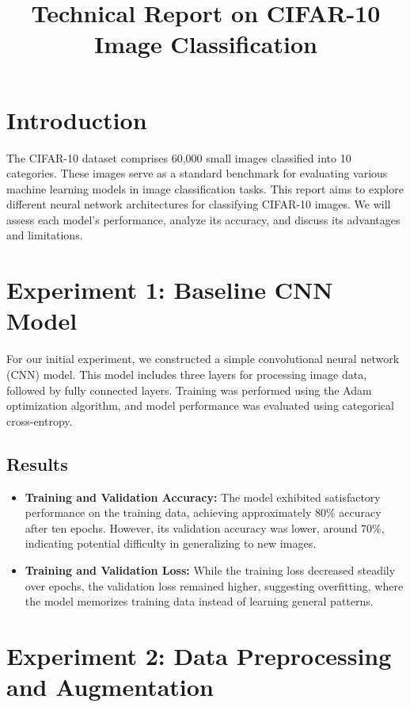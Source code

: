 \documentclass{article}
\title{Technical Report on CIFAR-10 Image Classification}
\author{}
\date{}
\begin{document}
\maketitle

\section{Introduction}

The CIFAR-10 dataset comprises 60,000 small images classified into 10 categories. These images serve as a standard benchmark for evaluating various machine learning models in image classification tasks. This report aims to explore different neural network architectures for classifying CIFAR-10 images. We will assess each model's performance, analyze its accuracy, and discuss its advantages and limitations.

\section{Experiment 1: Baseline CNN Model}

For our initial experiment, we constructed a simple convolutional neural network (CNN) model. This model includes three layers for processing image data, followed by fully connected layers. Training was performed using the Adam optimization algorithm, and model performance was evaluated using categorical cross-entropy.

\subsection{Results}

\begin{itemize}
    \item \textbf{Training and Validation Accuracy:} The model exhibited satisfactory performance on the training data, achieving approximately 80\% accuracy after ten epochs. However, its validation accuracy was lower, around 70\%, indicating potential difficulty in generalizing to new images.
    \item \textbf{Training and Validation Loss:} While the training loss decreased steadily over epochs, the validation loss remained higher, suggesting overfitting, where the model memorizes training data instead of learning general patterns.
\end{itemize}

\section{Experiment 2: Data Preprocessing and Augmentation}
\end{document}
